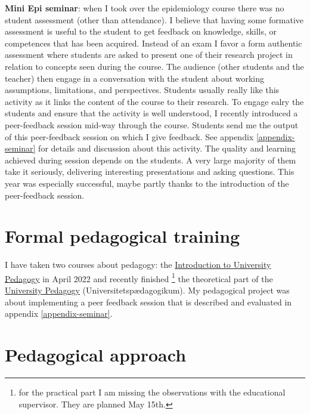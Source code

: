\documentclass[12pt]{article}
\begin{document}
\bigskip

\textbf{Mini Epi seminar}: when I took over the epidemiology course there was
no student assessment (other than attendance). I believe that having
some formative assessment is useful to the student to get feedback on
knowledge, skills, or competences that has been acquired. Instead of
an exam I favor a form authentic assessment where students are asked
to present one of their research project in relation to concepts seen
during the course. The audience (other students and the teacher) then
engage in a conversation with the student about working assumptions,
limitations, and perspectives. Students usually really like this
activity as it links the content of the course to their
research. \newline To engage ealry the students and ensure that the
activity is well understood, I recently introduced a peer-feedback
session mid-way through the course. Students send me the output of
this peer-feedback session on which I give feedback. See appendix
\ref{appendix-seminar} for details and discussion about this
activity. \newline The quality and learning achieved during session
depends on the students. A very large majority of them take it
seriously, delivering interesting presentations and asking
questions. This year was especially successful, maybe partly thanks to
the introduction of the peer-feedback session.


\clearpage


\section{Formal pedagogical training}
\label{sec:orgbe39e30}

I have taken two courses about pedagogy: the \href{https://absalon.ku.dk/courses/58829}{Introduction to
University Pedagogy} in April 2022 and recently finished \footnote{for the
practical part I am missing the observations with the educational
supervisor. They are planned May 15th.} the theoretical part of the
\href{https://absalon.ku.dk/courses/58114}{University Pedagogy} (Universitetspædagogikum). My pedagogical project
was about implementing a peer feedback session that is described and
evaluated in appendix \ref{appendix-seminar}.

\section{Pedagogical approach}
\label{sec:org459856f}
\end{document}
